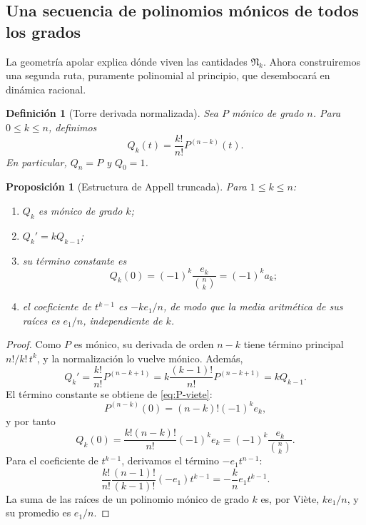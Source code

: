 \documentclass[11pt,oneside]{scrartcl}
\theoremstyle{plainblue}
\newtheorem{proposition}[theorem]{Proposición}
\theoremstyle{definitionblue}
\newtheorem{definition}[theorem]{Definición}
\theoremstyle{remarkgray}
\newcommand{\cN}{\mathfrak{N}}
\begin{document}
\subsection{Una secuencia de polinomios mónicos de todos los grados}

La geometría apolar explica dónde viven las cantidades \(\cN_k\). Ahora construiremos
una segunda ruta, puramente polinomial al principio, que desembocará en dinámica
racional.

\begin{definition}[Torre derivada normalizada]\label{def:Qk}
Sea \(P\) mónico de grado \(n\). Para \(0\le k\le n\), definimos
\begin{equation}\label{eq:Qk}
Q_k(t)=\frac{k!}{n!}P^{(n-k)}(t).
\end{equation}
En particular, \(Q_n=P\) y \(Q_0=1\).
\end{definition}

\begin{proposition}[Estructura de Appell truncada]\label{prop:Qk-properties}
Para \(1\le k\le n\):
\begin{enumerate}[label=\textup{(\roman*)}]
\item \(Q_k\) es mónico de grado \(k\);
\item \(Q_k'=kQ_{k-1}\);
\item su término constante es
\begin{equation}\label{eq:Qk-zero}
Q_k(0)=(-1)^k\frac{e_k}{\binom nk}=(-1)^ka_k;
\end{equation}
\item el coeficiente de \(t^{k-1}\) es \(-k e_1/n\), de modo que la media
aritmética de sus raíces es \(e_1/n\), independiente de \(k\).
\end{enumerate}
\end{proposition}

\begin{proof}
Como \(P\) es mónico, su derivada de orden \(n-k\) tiene término principal
\(n!/k!\,t^k\), y la normalización lo vuelve mónico. Además,
\[
Q_k' = \frac{k!}{n!}P^{(n-k+1)}
= k\frac{(k-1)!}{n!}P^{(n-k+1)}=kQ_{k-1}.
\]
El término constante se obtiene de \cref{eq:P-viete}:
\[
P^{(n-k)}(0)=(n-k)!(-1)^ke_k,
\]
y por tanto
\[
Q_k(0)=\frac{k!(n-k)!}{n!}(-1)^ke_k
=(-1)^k\frac{e_k}{\binom nk}.
\]
Para el coeficiente de \(t^{k-1}\), derivamos el término
\(-e_1t^{n-1}\):
\[
\frac{k!}{n!}\frac{(n-1)!}{(k-1)!}(-e_1)t^{k-1}
=-\frac{k}{n}e_1t^{k-1}.
\]
La suma de las raíces de un polinomio mónico de grado \(k\) es, por Viète,
\(ke_1/n\), y su promedio es \(e_1/n\).
\end{proof}
\end{document}
